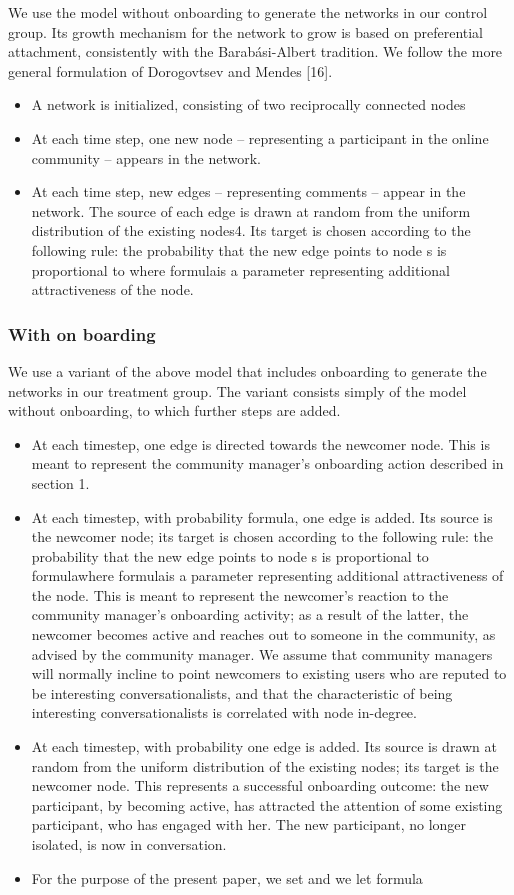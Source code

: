 We use the model without onboarding to generate the networks in our control group. Its growth mechanism for the network to grow is based on preferential attachment, consistently with the Barabási-Albert tradition. We follow the more general formulation of Dorogovtsev and Mendes [16].
\begin{itemize}
\item A network is initialized, consisting of two reciprocally connected nodes
\item At each time step, one new node – representing a participant in the online community – appears in the network. 
\item At each time step,  new edges – representing comments – appear in the network. The source of each edge is drawn at random from the uniform distribution of the existing nodes4. Its target is chosen according to the following rule: the probability that the new edge points to node s is proportional to where formulais a parameter representing additional attractiveness of the node.
\end{itemize}

\subsubsection*{With on boarding}

We use a variant of the above model that includes onboarding to generate the networks in our treatment group. The variant consists simply of the model without onboarding, to which further steps are added.
\begin{itemize}
\item At each timestep, one edge is directed towards the newcomer node. This is meant to represent the community manager's onboarding action described in section 1. 
\item At each timestep, with probability formula, one edge is added. Its source is the newcomer node; its target is chosen according to the following rule: the probability that the new edge points to node s is proportional to formulawhere formulais a parameter representing additional attractiveness of the node. This is meant to represent the newcomer's reaction to the community manager's onboarding activity; as a result of the latter, the newcomer becomes active and reaches out to someone in the community, as advised by the community manager. We assume that community managers will normally incline to point newcomers to existing users who are reputed to be interesting conversationalists, and that the characteristic of being interesting conversationalists is correlated with node in-degree. 
\item At each timestep, with probability one edge is added. Its source is drawn at random from the uniform distribution of the existing nodes; its target is the newcomer node. This represents a successful onboarding outcome: the new participant, by becoming active, has attracted the attention of some existing participant, who has engaged with her. The new participant, no longer isolated, is now in conversation.
\item For the purpose of the present paper, we set and we let formula
\end{itemize}
